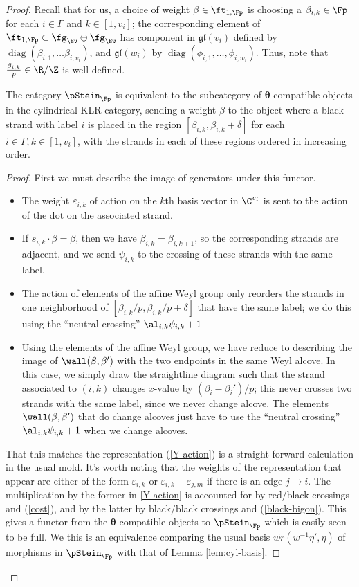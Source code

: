 \begin{proof}
Recall that for us, a choice of weight $\beta\in \ft_{1,\Fp}$ is choosing a $\beta_{i,k}\in \Fp$ for each $i\in \Gamma$ and $k\in [1,v_i]$; the corresponding element of $\ft_{1,\Fp}\subset \fg_{\Bv}\oplus \fg_{\Bw}$ has component in $\mathfrak{gl}(v_i)$ defined by $\operatorname{diag}(\beta_{i,1},\dots \beta_{i,v_i})$, and $\mathfrak{gl}(w_i)$ by $\operatorname{diag}(\phi_{i,1},\dots, \phi_{i,w_i})$.
Thus, note that $ \frac{\beta_{i,k}}{p}\in \R/\Z$ is well-defined. 
\begin{theorem}\label{thm:KLR-equiv}
The category $\pStein_\Fp$ is equivalent to the subcategory of
$\boldsymbol{\theta}$-compatible objects in the cylindrical KLR category, sending a weight $\beta$ to the object where a black strand with label $i$ is placed in the region $[\beta_{i,k},\beta_{i,k}+\delta]$ for each $i\in \Gamma, k\in [1,v_i]$, with the strands in each of these regions ordered in increasing order.
\end{theorem}
\begin{proof}
First we must describe the image of generators under this functor. \begin{itemize}
\item The weight $\varepsilon_{i,k}$ of action on the $k$th basis vector in $\C^{v_i}$ is sent to the action of the dot on the associated strand.
\item If $s_{i,k}\cdot \beta=\beta$, then we have $\beta_{i,k}=\beta_{i,k+1}$, so the corresponding strands are adjacent, and we send $\psi_{i,k}$ to the crossing of these strands with the same label.
\item The action of elements of the affine Weyl group only reorders the strands in one neighborhood of $[\beta_{i,k}/p,\beta_{i,k}/p+\delta]$ that have the same label; we do this using the ``neutral crossing'' $\al_{i,k}\psi_{i,k}+1$
\item Using the elements of the affine Weyl group, we have reduce to describing the image of $\wall(\beta,\beta')$ with the two endpoints in the same Weyl alcove.  In this case, we simply draw the straightline diagram such that the strand associated to $(i,k)$ changes $x$-value by $(\beta_i-\beta_i')/p$; this never crosses two strands with the same label, since we never change alcove.  The elements $\wall(\beta,\beta')$ that do change alcoves just have to use the ``neutral crossing'' $\al_{i,k}\psi_{i,k}+1$ when we change alcoves. 
\end{itemize} 
That this matches the representation (\ref{Y-action})  is a straight forward calculation in the usual mold.  It's worth noting that the weights of the representation that appear are either of the form $\varepsilon_{i,k}$ or $\varepsilon_{i,k}-\varepsilon_{j,m}$ if there is an edge $j\to i$.  The multiplication by the former in \ref{Y-action} is accounted for by red/black crossings and (\ref{cost}), and by the latter by black/black crossings and (\ref{black-bigon}).  This gives a functor from the $\boldsymbol{\theta}$-compatible objects to  $\pStein_\Fp$ which is easily seen to be full.  We this is an equivalence comparing the usual basis $w\tilde{r}(w^{-1}\eta',\eta)$ of morphisms in $\pStein_\Fp$ with that of Lemma \ref{lem:cyl-basis}.

\end{proof}
\end{proof}
